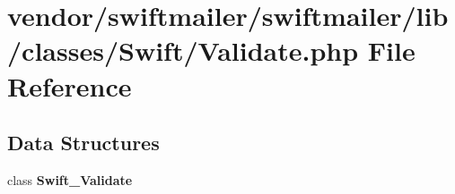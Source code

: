 \section{vendor/swiftmailer/swiftmailer/lib/classes/\+Swift/\+Validate.php File Reference}
\label{_validate_8php}
\subsection*{Data Structures}
\begin{DoxyCompactItemize}
\item 
class {\bf Swift\+\_\+\+Validate}
\end{DoxyCompactItemize}
